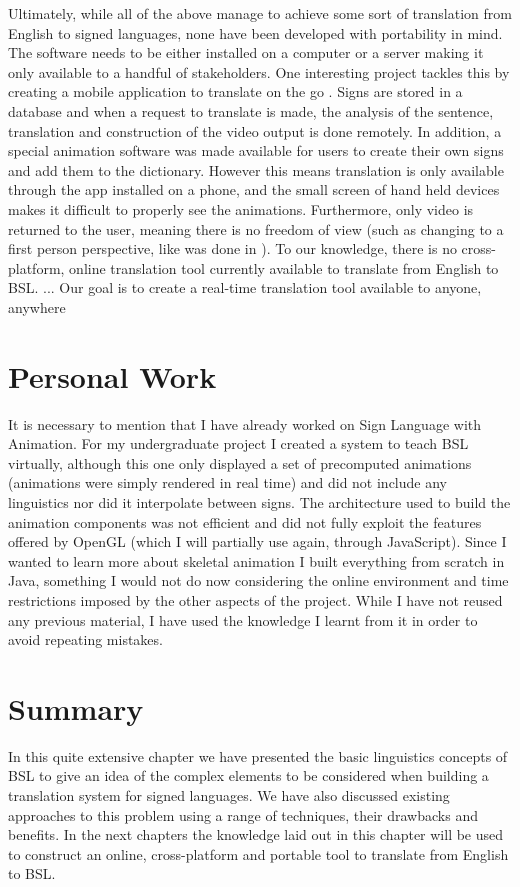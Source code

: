 \documentclass[12pt]{ociamthesis}  %
\begin{document}
Ultimately, while all of the above manage to achieve some sort of translation from English to signed languages, none have been developed with portability in mind. The software needs to be either installed on a computer or a server making it only available to a handful of stakeholders. One interesting project tackles this by creating a mobile application to translate on the go . Signs are stored in a database and when a request to translate is made, the analysis of the sentence, translation and construction of the video output is done remotely. In addition, a special animation software was made available for users to create their own signs and add them to the dictionary. However this means translation is only available through the app installed on a phone, and the small screen of hand held devices makes it difficult to properly see the animations. Furthermore, only video is returned to the user, meaning there is no freedom of view (such as changing to a first person perspective, like was done in ). To our knowledge, there is no cross-platform, online translation tool currently available  to translate from English to BSL. ... Our goal is to create a real-time translation tool available to anyone, anywhere

\section{Personal Work}
It is necessary to mention that I have already worked on Sign Language with Animation. For my undergraduate project I created a system to teach BSL virtually, although this one only displayed a set of precomputed animations (animations were simply rendered in real time) and did not include any linguistics nor did it interpolate between signs. The architecture used to build the animation components was not efficient and did not fully exploit the features offered by OpenGL (which I will partially use again, through JavaScript). Since I wanted to learn more about skeletal animation I built everything from scratch in Java, something I would not do now considering the online environment and time restrictions imposed by the other aspects of the project. While I have not reused any previous material, I have used the knowledge I learnt from it in order to avoid repeating mistakes.
\section{Summary}
In this quite extensive chapter we have presented the basic linguistics concepts of BSL to give an idea of the complex elements to be considered when building a translation system for signed languages. We have also discussed existing approaches to this problem using a range of techniques, their drawbacks and benefits. In the next chapters the knowledge laid out in this chapter will be used to construct an online, cross-platform and portable tool to translate from English to BSL.
\end{document}
